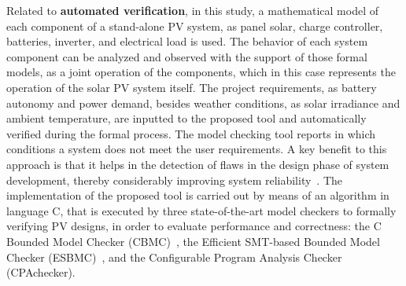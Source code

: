 Related to \textbf{automated verification}, in this study, a mathematical model of each component of a stand-alone PV system, as panel solar, charge controller, batteries, inverter, and electrical load is used. The behavior of each system component can be analyzed and observed with the support of those formal models, as a joint operation of the components, which in this case represents the operation of the solar PV system itself. The project requirements, as battery autonomy and power demand, besides weather conditions, as solar irradiance and ambient temperature, are inputted to the proposed tool and automatically verified during the formal process. The model checking tool reports in which conditions a system does not meet the user requirements. A key benefit to this approach is that it helps in the detection of flaws in the design phase of system development, thereby considerably improving system reliability~\cite{Akram2018}. 
The implementation of the proposed tool is carried out by means of an algorithm in language C, that is executed by three state-of-the-art model checkers to formally verifying PV designs, in order to evaluate performance and correctness: the C Bounded Model Checker (CBMC)~\cite{Kroening}, the Efficient SMT-based Bounded Model Checker (ESBMC)~\cite{esbmc2018}, and the Configurable Program Analysis Checker (CPAchecker).

